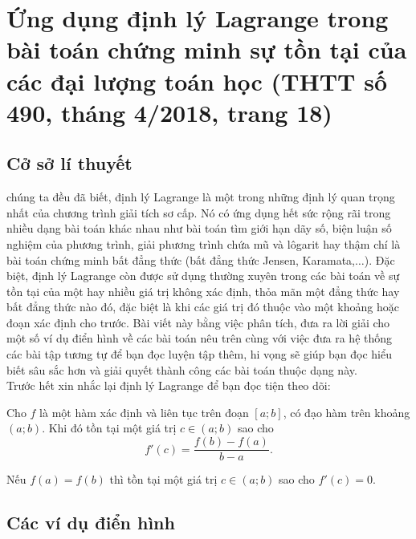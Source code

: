 \section{Ứng dụng định lý Lagrange trong bài toán chứng minh sự tồn tại của các đại lượng toán học (THTT số 490, tháng 4/2018, trang 18)}
\begin{center}
	\textbf{\color{violet}{Trần Trung Dũng\\
			(B12D48, T31, Bộ Công An)}}
\end{center}
\subsection{Cở sở lí thuyết}
 chúng ta đều đã biết, định lý Lagrange là một trong những định lý quan trọng nhất của chương trình giải tích sơ cấp. Nó có ứng dụng hết sức rộng rãi trong nhiều dạng bài toán khác nhau như bài toán tìm giới hạn dãy số, biện luận số nghiệm của phương trình, giải phương trình chứa mũ và lôgarit hay thậm chí là bài toán chứng minh bất đẳng thức (bất đẳng thức Jensen, Karamata,$\dots$). Đặc biệt, định lý Lagrange còn được sử dụng thường xuyên trong các bài toán về sự tồn tại của một hay nhiều giá trị không xác định, thỏa mãn một đẳng thức hay bất đẳng thức nào đó, đặc biệt là khi các giá trị đó thuộc vào một khoảng hoặc đoạn xác định cho trước. Bài viết này bằng việc phân tích, đưa ra lời giải cho một số ví dụ điển hình về các bài toán nêu trên cùng với việc đưa ra hệ thống các bài tập tương tự để bạn đọc luyện tập thêm, hi vọng sẽ giúp bạn đọc hiểu biết sâu sắc hơn và giải quyết thành công các bài toán thuộc dạng này.\\
Trước hết xin nhắc lại định lý Lagrange để bạn đọc tiện theo dõi:
{\color{blue}\begin{dl}[Lagrange]
		Cho $f$ là một hàm xác định và liên tục trên đoạn $[a;b]$, có đạo hàm trên khoảng $(a;b)$. Khi đó tồn tại một giá trị $c \in (a; b)$ sao cho $$f'(c)=\dfrac{f(b)-f(a)}{b-a}.$$ 
\end{dl}}
 Nếu $f(a)=f(b)$ thì tồn tại một giá trị $c \in (a; b)$ sao cho $f'(c)=0.$
\subsection{Các ví dụ điển hình}

